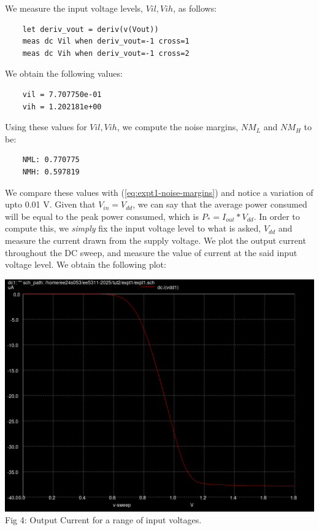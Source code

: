 \documentclass[12pt,a4paper]{article}
\begin{document}
\noindent We measure the input voltage levels, $Vil, Vih$, as follows:

\begin{verbatim}
    let deriv_vout = deriv(v(Vout))
    meas dc Vil when deriv_vout=-1 cross=1
    meas dc Vih when deriv_vout=-1 cross=2
\end{verbatim}

\noindent We obtain the following values:

\begin{verbatim}
    vil = 7.707750e-01
    vih = 1.202181e+00
\end{verbatim}

\noindent Using these values for $Vil, Vih$, we compute the noise margins, $NM_{L}$ and $NM_{H}$ to be:

\begin{verbatim}
    NML: 0.770775
    NMH: 0.597819
\end{verbatim}

\noindent We compare these values with (\ref{eq:expt1-noise-margins}) and notice a variation of upto 0.01 V.
\newline
\noindent Given that $V_{in} = V_{dd}$, we can say that the average power consumed will be equal to the peak power consumed, which is $P_* = I_{out} * V_{dd}$. In order to compute this, we \emph{simply} fix the input voltage level to what is asked, $V_{dd}$ and measure the current drawn from the supply voltage. We plot the output current throughout the DC sweep, and measure the value of current at the said input voltage level. We obtain the following plot:

\begin{center}
\includegraphics[scale=0.3]{tut2/reports/media/expt1_iout.png} \\ Fig 4: Output Current for a range of input voltages.
\end{center}
\end{document}
